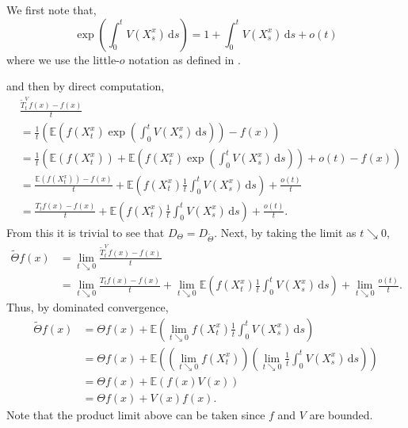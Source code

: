 \documentclass[a4paper,12pt,draft]{report}
\theoremstyle{remark}
\theoremstyle{definition}
\begin{document}
{
We first note that,
$$
\exp\left(\int_0^t V(X_s^x)\,\mathrm{d}s\right) = 1 + \int_0^t V(X_s^x)\,\mathrm{d}s + o(t)
$$
where we use the little-$o$ notation as defined in \cite{NGDB}.

and then by direct computation,
\begin{align}
& \frac{\tilde{T}_t^Vf(x) - f(x)}{t}\nonumber\\
& = \frac{1}{t}\left(\mathbb{E}\left(f(X_t^x)\exp\left(\int_0^t V(X_s^x)\,\mathrm{d}s\right)\right) - f(x)\right)\nonumber\\
& = \frac{1}{t}\left(\mathbb{E}(f(X_t^x)) + \mathbb{E}\left(f(X_t^x)\exp\left(\int_0^t V(X_s^x)\,\mathrm{d}s\right)\right) + o(t) - f(x)\right)\nonumber\\
& = \frac{\mathbb{E}(f(X_t^x)) - f(x)}{t} + \mathbb{E}\left(f(X_t^x)\frac{1}{t}\int_0^t V(X_s^x)\,\mathrm{d}s\right) + \frac{o(t)}{t}\nonumber\\
& = \frac{T_tf(x) - f(x)}{t} + \mathbb{E}\left(f(X_t^x)\frac{1}{t}\int_0^t V(X_s^x)\,\mathrm{d}s\right) + \frac{o(t)}{t}.\nonumber
\end{align}
From this it is trivial to see that $D_\Theta = D_{\tilde{\Theta}}$.  Next, by taking the limit as $t \searrow 0$,
\begin{align}
\tilde{\Theta} f(x) & = \lim_{t \searrow 0}\frac{\tilde{T}_t^Vf(x) - f(x)}{t}\nonumber\\
& = \lim_{t \searrow 0}\frac{T_tf(x) - f(x)}{t} + \lim_{t \searrow 0}\mathbb{E}\left(f(X_t^x)\frac{1}{t}\int_0^t V(X_s^x)\,\mathrm{d}s\right) + \lim_{t \searrow 0}\frac{o(t)}{t}.\nonumber
\end{align}
Thus, by dominated convergence,
\begin{align}
\tilde{\Theta} f(x) & = \Theta f(x) + \mathbb{E}\left(\lim_{t \searrow 0}f(X_t^x)\frac{1}{t}\int_0^t V(X_s^x)\,\mathrm{d}s\right)\nonumber\\
& = \Theta f(x) + \mathbb{E}\left(\left(\lim_{t \searrow 0}f(X_t^x)\right)\left(\lim_{t \searrow 0}\frac{1}{t}\int_0^t V(X_s^x)\,\mathrm{d}s\right)\right)\nonumber\\
& = \Theta f(x) + \mathbb{E}(f(x)V(x))\nonumber\\
& = \Theta f(x) + V(x)f(x).\nonumber
\end{align}
Note that the product limit above can be taken since $f$ and $V$ are bounded.

\qedhere
}
\end{document}
